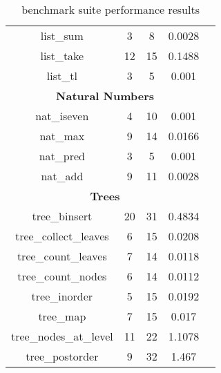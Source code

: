 \begin{table}
\begin{center}
\begin{tabular}{ccccc}
list\_sum & 3 & 8 & 0.0028 \\
list\_take & 12 & 15 & 0.1488 \\
list\_tl & 3 & 5 & 0.001 \\
\multicolumn{4}{c}{\textbf{Natural Numbers}} \\
nat\_iseven & 4 & 10 & 0.001 \\
nat\_max & 9 & 14 & 0.0166 \\
nat\_pred & 3 & 5 & 0.001 \\
nat\_add & 9 & 11 & 0.0028 \\
\multicolumn{4}{c}{\textbf{Trees}} \\
tree\_binsert & 20 & 31 & 0.4834 \\
tree\_collect\_leaves & 6 & 15 & 0.0208 \\
tree\_count\_leaves & 7 & 14 & 0.0118 \\
tree\_count\_nodes & 6 & 14 & 0.0112 \\
tree\_inorder & 5 & 15 & 0.0192 \\
tree\_map & 7 & 15 & 0.017 \\
tree\_nodes\_at\_level & 11 & 22 & 1.1078 \\
tree\_postorder & 9 & 32 & 1.467 \\

  \hline
  \end{tabular}
  \end{center}
  \caption{\myth{} benchmark suite performance results}
  \label{fig:myth-raw-benchmarks}
\end{table}

